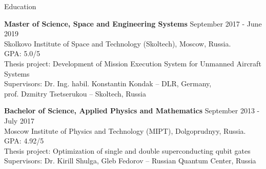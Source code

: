 \documentclass{resume} %
\begin{document}



\begin{rSection}{Education}


{\bf Master of Science, Space and Engineering Systems} \hfill {September 2017 - June 2019}
\\ 
Skolkovo Institute of Space and Technology (Skoltech), Moscow, Russia.
\\
GPA: 5.0/5
\\
{Thesis project: Development of Mission Execution System for Unmanned Aircraft Systems}
\\
{Supervisors: Dr. Ing. habil. Konstantin Kondak -- DLR, Germany,\\} 
{prof. Dzmitry Tsetserukou -- Skoltech, Russia}

{\bf Bachelor of Science, Applied Physics and Mathematics} \hfill {September 2013 - July 2017}
\\ 
Moscow Institute of Physics and Technology (MIPT), Dolgoprudnyy, Russia.
\\
GPA: 4.92/5
\\
Thesis project: Optimization of single and double superconducting qubit gates 
\\
Supervisors: Dr. Kirill Shulga, Gleb Fedorov -- Russian Quantum Center, Russia



\end{rSection}
\end{document}
